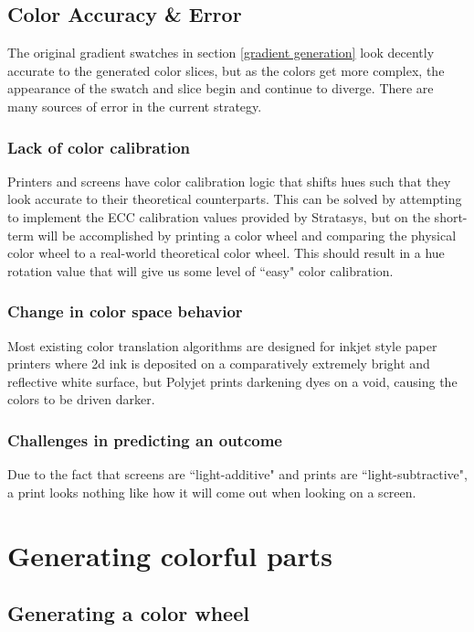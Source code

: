 \documentclass{article}
\begin{document}
\begin{multicols}{2}
\subsection{Color Accuracy \& Error}

The original gradient swatches in section \ref{gradient generation} look decently accurate to the generated color slices, but as the colors get more complex, the appearance of the swatch and slice begin and continue to diverge. There are many sources of error in the current strategy.

\subsubsection{Lack of color calibration}

Printers and screens have color calibration logic that shifts hues such that they look accurate to their theoretical counterparts. This can be solved by attempting to implement the ECC calibration values provided by Stratasys, but on the short-term will be accomplished by printing a color wheel and comparing the physical color wheel to a real-world theoretical color wheel. This should result in a hue rotation value that will give us some level of ``easy" color calibration. 

\subsubsection{Change in color space behavior}

Most existing color translation algorithms are designed for inkjet style paper printers where 2d ink is deposited on a comparatively extremely bright and reflective white surface, but Polyjet prints darkening dyes on a void, causing the colors to be driven darker.

\subsubsection{Challenges in predicting an outcome}

Due to the fact that screens are ``light-additive" and prints are ``light-subtractive", a print looks nothing like how it will come out when looking on a screen.

\section{Generating colorful parts}

\subsection{Generating a color wheel}


\end{multicols}
\end{document}
